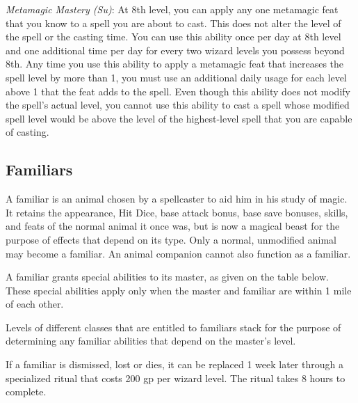 \textit{Metamagic Mastery (Su)}: At 8th level, you can apply any one metamagic feat that you know to a spell you are about to cast. This does not alter the level of the spell or the casting time. You can use this ability once per day at 8th level and one additional time per day for every two wizard levels you possess beyond 8th. Any time you use this ability to apply a metamagic feat that increases the spell level by more than 1, you must use an additional daily usage for each level above 1 that the feat adds to the spell. Even though this ability does not modify the spell's actual level, you cannot use this ability to cast a spell whose modified spell level would be above the level of the highest-level spell that you are capable of casting.
				
\subsection{Familiars}

				
A familiar is an animal chosen by a spellcaster to aid him in his study of magic. It retains the appearance, Hit Dice, base attack bonus, base save bonuses, skills, and feats of the normal animal it once was, but is now a magical beast for the purpose of effects that depend on its type. Only a normal, unmodified animal may become a familiar. An animal companion cannot also function as a familiar.
				
A familiar grants special abilities to its master, as given on the table below. These special abilities apply only when the master and familiar are within 1 mile of each other.
				
Levels of different classes that are entitled to familiars stack for the purpose of determining any familiar abilities that depend on the master's level.
				
If a familiar is dismissed, lost or dies, it can be replaced 1 week later through a specialized ritual that costs 200 gp per wizard level. The ritual takes 8 hours to complete.


